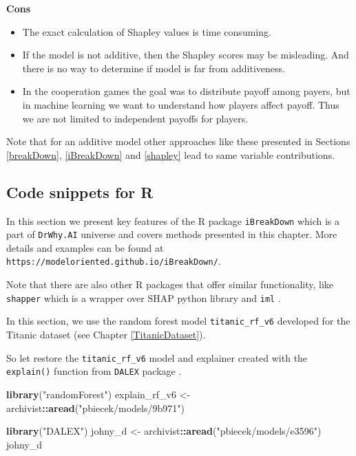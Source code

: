 \documentclass[12pt,]{krantz}
\newenvironment{Shaded}{\begin{snugshade}}{\end{snugshade}}
\newcommand{\KeywordTok}[1]{\textcolor[rgb]{0.13,0.29,0.53}{\textbf{#1}}}
\newcommand{\NormalTok}[1]{#1}
\newcommand{\OperatorTok}[1]{\textcolor[rgb]{0.81,0.36,0.00}{\textbf{#1}}}
\newcommand{\StringTok}[1]{\textcolor[rgb]{0.31,0.60,0.02}{#1}}
\providecommand{\tightlist}{%
  \setlength{\itemsep}{0pt}\setlength{\parskip}{0pt}}
\theoremstyle{definition}
\theoremstyle{definition}
\theoremstyle{definition}
\theoremstyle{remark}
\begin{document}
\textbf{Cons}

\begin{itemize}
\tightlist
\item
  The exact calculation of Shapley values is time consuming.
\item
  If the model is not additive, then the Shapley scores may be
  misleading. And there is no way to determine if model is far from
  additiveness.
\item
  In the cooperation games the goal was to distribute payoff among
  payers, but in machine learning we want to understand how players
  affect payoff. Thus we are not limited to independent payoffs for
  players.
\end{itemize}

Note that for an additive model other approaches like these presented in
Sections \ref{breakDown}, \ref{iBreakDown} and \ref{shapley} lead to
same variable contributions.

\hypertarget{code-snippets-for-r-2}{%
\subsection{Code snippets for R}\label{code-snippets-for-r-2}}

In this section we present key features of the R package
\texttt{iBreakDown} \citep{iBreakDownRPackage} which is a part of
\texttt{DrWhy.AI} universe and covers methods presented in this chapter.
More details and examples can be found at
\texttt{https://modeloriented.github.io/iBreakDown/}.

Note that there are also other R packages that offer similar
functionality, like \texttt{shapper} \citep{shapperPackage} which is a
wrapper over SHAP python library \citep{shapPackage} and \texttt{iml}
\citep{imlRPackage}.

In this section, we use the random forest \citep{R-randomForest} model
\texttt{titanic\_rf\_v6} developed for the Titanic dataset (see Chapter
\ref{TitanicDataset}).

So let restore the \texttt{titanic\_rf\_v6} model and explainer created
with the \texttt{explain()} function from \texttt{DALEX} package
\citep{R-DALEX}.

\begin{Shaded}
\begin{Highlighting}[]
\KeywordTok{library}\NormalTok{(}\StringTok{"randomForest"}\NormalTok{)}
\NormalTok{explain_rf_v6 <-}\StringTok{ }\NormalTok{archivist}\OperatorTok{::}\KeywordTok{aread}\NormalTok{(}\StringTok{"pbiecek/models/9b971"}\NormalTok{)}

\KeywordTok{library}\NormalTok{(}\StringTok{"DALEX"}\NormalTok{)}
\NormalTok{johny_d <-}\StringTok{ }\NormalTok{archivist}\OperatorTok{::}\KeywordTok{aread}\NormalTok{(}\StringTok{"pbiecek/models/e3596"}\NormalTok{)}
\NormalTok{johny_d}
\end{Highlighting}
\end{Shaded}
\end{document}
